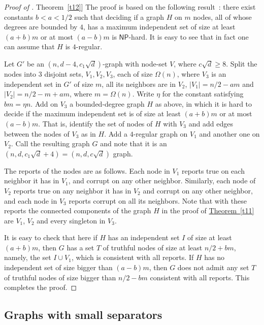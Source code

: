 \documentclass[11pt]{article}
\numberwithin{equation}{section}
\theoremstyle{definition}
\theoremstyle{plain}
\newcommand{\cclass}[1]{\textsf{#1}}
\newcommand{\expref}[2]{\hyperref[#2]{#1~\ref{#2}}}
\begin{document}
\noindent
%
\begin{proof}[Proof of \expref{Theorem}{t12}]
The proof is based on the following result~\cite{BK99}: there exist
constants $b<a<1/2$ such that deciding if a graph $H$ on $m$ nodes,
all of whose degrees are bounded by $4$, has a maximum independent set
of size at least $(a+b) m$ or at most $(a-b) m$ is $\cclass{NP}$-hard.
It is easy to see that in fact one can assume that 
$H$ is $4$-regular. 
 
Let $G'$ be an $(n,d-4,c_1\sqrt{d})$-graph with node-set $V$, where
$c \sqrt{d} \geq 8$.  
Split the nodes into $3$ disjoint sets, $V_1,V_2,V_3$, each
of size $\Omega(n)$, 
where $V_3$ is an independent set in $G'$ of size $m$, all its neighbors
are in $V_2$, $|V_1|=n/2-am$ and $|V_2|=n/2-m+am$, 
where $m = \Omega(n)$. Write $\eta$ for the constant satisfying $b m=\eta n$. 
%
%
Add on $V_3$ a bounded-degree graph $H$ as above, in which it is hard to
decide if the maximum independent set is of size at least $(a+b)m$ or at
most $(a-b)m$. That is, identify the set of nodes of $H$ with $V_3$
and add edges between the nodes of $V_3$ as in $H$. 
Add a $4$-regular graph on $V_1$ and another one on $V_2$. 
Call the resulting
graph $G$ and note that it is an $(n,d,c_1\sqrt{d} + 4)=
(n,d,c\sqrt d)$ graph. 

The reports of the nodes are as follows.  Each node in $V_1$
reports true on each neighbor it has in $V_1$, and corrupt on  any other
neighbor. Similarly, each node of $V_2$ reports true on any neighbor
it has in $V_2$ and corrupt on any other neighbor, and each node in $V_3$
reports corrupt on all its neighbors.  Note that with these reports the
connected components of the graph $H$ in the proof of \expref{Theorem}{t11}
are $V_1$, $V_2$ and every singleton in $V_3$.

It is easy to check that here if $H$ has an independent set $I$ of size
at least $(a+b)m$, then $G$ has a set $T$ of truthful  nodes of size
at least $n/2+bm$, namely, the set $I \cup V_1$, which is consistent with
all reports. If $H$ has no independent set of size bigger than $(a-b)m$,
then $G$ does not admit any set $T$ of truthful nodes of size bigger
than $n/2 - bm$ consistent with all reports. This completes the proof.
%
%
\end{proof}

\subsection{Graphs with small separators} \label{subsec:bad_expanders}
\end{document}
